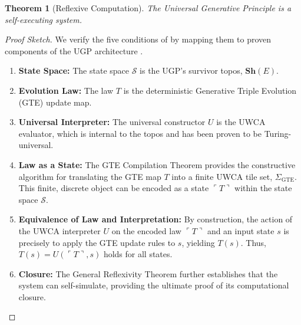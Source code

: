 \documentclass[12pt]{article}
\newtheorem{theorem}{Theorem}[section]
\newcommand{\GTE}{\text{GTE}}
\begin{document}
\begin{theorem}[Reflexive Computation]
\label{thm:reflexive_computation}
The Universal Generative Principle is a self-executing system.
\end{theorem}
\begin{proof}[Proof Sketch]
We verify the five conditions of  by mapping them to proven components of the UGP architecture \cite{Spivack2025UGP}.
\begin{enumerate}[leftmargin=*, itemsep=0.2em]
    \item \textbf{State Space:} The state space $\mathcal{S}$ is the UGP's survivor topos, $\mathbf{Sh}(E)$.
    \item \textbf{Evolution Law:} The law $T$ is the deterministic Generative Triple Evolution (GTE) update map.
    \item \textbf{Universal Interpreter:} The universal constructor $U$ is the UWCA evaluator, which is internal to the topos and has been proven to be Turing-universal.
    \item \textbf{Law as a State:} The GTE Compilation Theorem provides the constructive algorithm for translating the GTE map $T$ into a finite UWCA tile set, $\Sigma_{\GTE}$. This finite, discrete object can be encoded as a state $\ulcorner T \urcorner$ within the state space $\mathcal{S}$.
    \item \textbf{Equivalence of Law and Interpretation:} By construction, the action of the UWCA interpreter $U$ on the encoded law $\ulcorner T \urcorner$ and an input state $s$ is precisely to apply the GTE update rules to $s$, yielding $T(s)$. Thus, $T(s) = U(\ulcorner T \urcorner, s)$ holds for all states.
    \item \textbf{Closure:} The General Reflexivity Theorem further establishes that the system can self-simulate, providing the ultimate proof of its computational closure. \qedhere
\end{enumerate}
\end{proof}
\end{document}
